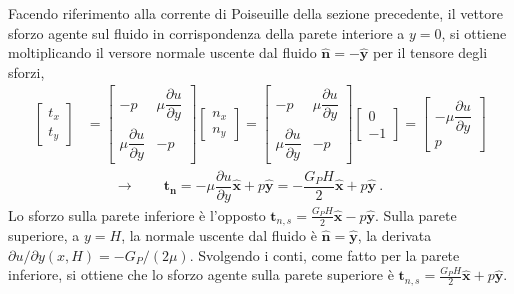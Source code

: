 Facendo riferimento alla corrente di Poiseuille della sezione precedente, il vettore sforzo agente sul fluido in corrispondenza della parete interiore a $y=0$, si ottiene moltiplicando il versore normale uscente dal fluido $\bm{\hat{n}} = - \bm{\hat{y}}$ per il tensore degli sforzi,
\begin{equation}
\begin{aligned}
 \begin{bmatrix} t_x \\ t_y \end{bmatrix} & = 
 \begin{bmatrix}
   -p & \mu \dfrac{\partial u}{\partial y} \\ \mu \dfrac{\partial u}{\partial y} & -p
 \end{bmatrix} 
 \begin{bmatrix} n_x \\ n_y \end{bmatrix} = 
 \begin{bmatrix}
   -p & \mu \dfrac{\partial u}{\partial y} \\ \mu \dfrac{\partial u}{\partial y} & -p
 \end{bmatrix} 
 \begin{bmatrix} 0 \\ -1 \end{bmatrix} = 
 \begin{bmatrix} - \mu \dfrac{\partial u}{\partial y} \\ p \end{bmatrix} \\
 & \qquad \rightarrow \qquad \bm{t_n} =  - \mu \dfrac{\partial u}{\partial y} \bm{\hat{x}} + p \bm{\hat{y}} = - \dfrac{G_P H}{2} \bm{\hat{x}} + p \bm{\hat{y}} \ .
\end{aligned}
\end{equation}
 Lo sforzo sulla parete inferiore è l'opposto $\bm{t}_{n,s} = \frac{G_P H}{2} \bm{\hat{x}} - p \bm{\hat{y}}$. Sulla parete superiore, a $y=H$, la normale uscente dal fluido è $\bm{\hat{n}} = \bm{\hat{y}}$, la derivata $\partial u/\partial y (x,H) = -G_P/(2\mu)$. Svolgendo i conti, come fatto per la parete inferiore, si ottiene che lo sforzo agente sulla parete superiore è $\bm{t}_{n,s} = \frac{G_P H}{2} \bm{\hat{x}} + p \bm{\hat{y}}$.

